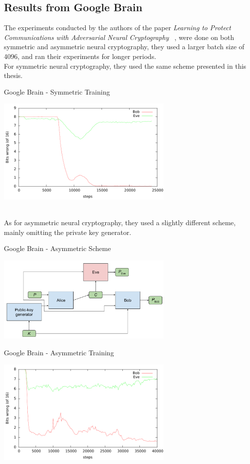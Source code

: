 \documentclass[a4paper, 12pt]{report}
\begin{document}
\subsection{\textbf{Results from Google Brain} ~\citep{DBLP:journals/corr/AbadiA16}}
The experiments conducted by the authors of the paper \textit{Learning to Protect Communications with Adversarial Neural Cryptography} ~\citep{DBLP:journals/corr/AbadiA16}, were done on both symmetric and asymmetric neural cryptography, they used a larger batch size of 4096, and ran their experiments for longer periods.\\
For symmetric neural cryptography, they used the same scheme presented in this thesis.
\begin{blockfigure}{Google Brain - Symmetric Training}
	\begin{center}
		\includegraphics[width = 0.65\textwidth]{cryptolearn_batch_tighter}
	\end{center}
\end{blockfigure}\\
As for asymmetric neural cryptography, they used a slightly different scheme, mainly omitting the private key generator.
\begin{blockfigure}{Google Brain - Asymmetric Scheme}
	\begin{center}
		\includegraphics[width = 0.65\textwidth]{asymm}
	\end{center}
\end{blockfigure}
\begin{blockfigure}{Google Brain - Asymmetric Training}
	\begin{center}
		\includegraphics[width = 0.65\textwidth]{pubkey_bob_v_eve}
	\end{center}
\end{blockfigure}
\newpage
\end{document}
